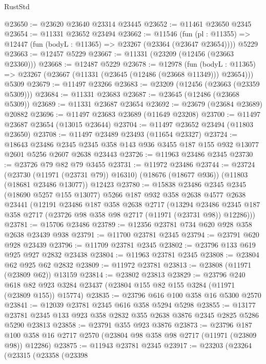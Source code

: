 \begin{lexlean}{RustStd}
\begin{coremodule}
@23650 := @23620 @23640 @23314 @23445
@23652 := @11461 @23650 @2345
@23654 := @11331 @23652 @23494
@23662 := @11546
    (fun (pl : @11355) => @12447 (fun (bodyL : @11365) => @23267 (@23364 (@23647 @23654))))
    @5229
@23663 := @12457 @5229
@23667 := @11331 (@23209 (@12456 (@23663 @23360)))
@23668 := @12487 @5229
@23678 := @12978
    (fun (bodyL : @11365) => @23267 (@23667 (@11331 (@23645 (@12486 (@23668 @11349))) @23654)))
    @5309
@23679 := @11497 @23266
@23683 := @23209 (@12456 (@23663 (@23359 @5309)))
@23684 := @11331 @23683
@23687 := @23645 (@12486 (@23668 @5309))
@23689 := @11331 @23687 @23654
@23692 := @23679 (@23684 @23689) @20882
@23696 := @11497 @23683 @23689 (@11649 @23208)
@23700 := @11497 @23687 @23654 (@13015 @23644)
@23704 := @11497 @23652 @23494 (@11803 @23650)
@23708 := @11497 @23489 @23493 (@11654 @23327)
@23724 := @18643
    @23486
    @2345
    @2345
    @358
    @143
    @936
    @3455
    @187
    @155
    @932
    @13077
    @2601
    @5256
    @2607
    @2638
    @23443
@23726 := @11963 @23486 @2345
@23730 := @23726 @79 @82 @79 @3455
@23731 := @11972 @23486
@23744 := @23724
    (@23730 (@11971 (@23731 @79)) @16310)
    (@18676 (@18677 @936))
    (@11803 (@18681 @23486 @13077))
    @12423
@23780 := @15838
    @23486
    @2345
    @2345
    (@18690 @5257 @155 @13077)
    @5266
    @187
    @932
    @358
    @2638
    @4577
    @2638
    @23441
    (@12191
      @23486
      @187
      @358
      @2638
      @2717
      (@13294
        @23486
        @2345
        @187
        @358
        @2717
        (@23726 @98 @358 @98 @2717 (@11971 (@23731 @98)) @12286)))
@23781 := @15706 @23486
@23789 := @12356 @23781 @734 @620 @928 @358 @2638 @23439 @938
@23791 := @11700 @23781 @2345
@23794 := @23791 @620 @928 @23439
@23796 := @11709 @23781 @2345
@23802 := @23796 @133 @619 @925 @927 @2832 @23438
@23804 := @11963 @23781 @2345
@23808 := @23804 @62 @925 @62 @2832
@23809 := @11972 @23781
@23813 := @23808 (@11971 (@23809 @62)) @13159
@23814 := @23802 @23813
@23829 := @23796
    @240
    @618
    @82
    @923
    @3284
    @23437
    (@23804 @155 @82 @155 @3284 (@11971 (@23809 @155)) @15774)
@23835 := @23796 @616 @100 @358 @16 @5300 @2570
@23841 := @12039 @23781 @2345 @616 @358 @5294 @5298
@23855 := @13177 @23781 @2345 @133 @923 @358 @2832 @355 @2638 @3876 @2345 @2825 @5286 @5290 @23813
@23858 := @23791 @355 @923 @3876
@23873 := @23796
    @187
    @100
    @358
    @16
    @2717
    @2570
    (@23804 @98 @358 @98 @2717 (@11971 (@23809 @98)) @12286)
@23875 := @11943 @23781 @2345
@23917 := @23203
    (@23264
      (@23315
        (@23358
          (@23398

\end{coremodule}
\end{lexlean}
